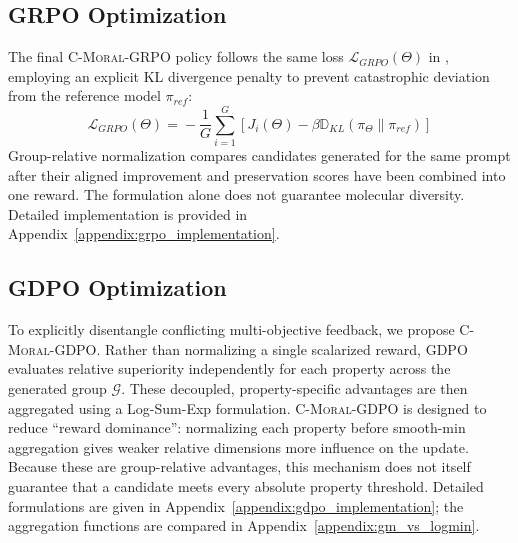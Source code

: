 \documentclass[11pt]{article}
\begin{document}
\subsection{GRPO Optimization}


The final \textsc{C-Moral}-GRPO policy follows the same loss $\mathcal{L}_{GRPO}(\Theta)$ in \cite{shao2024deepseekmathpushinglimitsmathematical}, employing an explicit KL divergence penalty to prevent catastrophic deviation from the reference model $\pi_{ref}$:
\begin{equation}
  \label{eq:grpo_loss}
  \mathcal{L}_{GRPO}(\Theta) \!=\! - \frac{1}{G} \sum_{i=1}^{G}\! \left[ J_i(\Theta) \!-\! \beta \mathbb{D}_{KL}(\pi_\Theta \| \pi_{ref}) \right]
\end{equation}
Group-relative normalization compares candidates generated for the same prompt after their aligned improvement and preservation scores have been combined into one reward. The formulation alone does not guarantee molecular diversity. Detailed implementation is provided in Appendix~\ref{appendix:grpo_implementation}.

\subsection{GDPO Optimization}
To explicitly disentangle conflicting multi-objective feedback, we propose \textsc{C-Moral}-GDPO. Rather than normalizing a single scalarized reward, GDPO evaluates relative superiority independently for each property across the generated group $\mathcal{G}$. These decoupled, property-specific advantages are then aggregated using a Log-Sum-Exp formulation. 
 \textsc{C-Moral}-GDPO is designed to reduce ``reward dominance'': normalizing each property before smooth-min aggregation gives weaker relative dimensions more influence on the update. Because these are group-relative advantages, this mechanism does not itself guarantee that a candidate meets every absolute property threshold. Detailed formulations are given in Appendix~\ref{appendix:gdpo_implementation}; the aggregation functions are compared in Appendix~\ref{appendix:gm_vs_logmin}.
\end{document}
